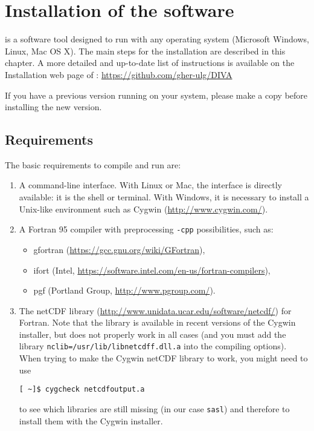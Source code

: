 \chapter{Installation of the software\label{chap:installation}}

\diva is a software tool designed to run with any operating system (Microsoft Windows, Linux, Mac OS X). The main steps for the installation are described in this chapter. A more detailed and up-to-date list of instructions is available on the Installation web page of \diva: \url{https://github.com/gher-ulg/DIVA}

\warning If you have a previous \diva version running on your system, please make a copy before installing the new version.


\minitoc




\section{Requirements}

The basic requirements to compile and run \diva are:
\begin{enumerate}
\item A command-line interface. With Linux or Mac, the interface is directly available: it is the shell or terminal. With Windows, it is necessary to install a Unix-like environment such as Cygwin (\url{http://www.cygwin.com/}).
\item A Fortran 95 compiler with preprocessing \texttt{-cpp} possibilities, such as:
\begin{itemize}
\item gfortran (\url{https://gcc.gnu.org/wiki/GFortran}),
\item ifort (Intel\textsuperscript{\textregistered}, \url{https://software.intel.com/en-us/fortran-compilers}),
\item pgf (Portland Group, \url{http://www.pgroup.com/}).
\end{itemize}    
\item The netCDF library (\url{http://www.unidata.ucar.edu/software/netcdf/}) for Fortran. Note that the library is available in recent versions of the Cygwin installer, but does not properly work in all cases (and you must add the library \texttt{nclib=/usr/lib/libnetcdff.dll.a} into the compiling options). When trying to make the Cygwin netCDF library to work, you might need to use 

\begin{lstlisting}[style=Bash]
[ ~]$ cygcheck netcdfoutput.a
\end{lstlisting}
to see which libraries are still missing (in our case \texttt{sasl}) and therefore to install them with the Cygwin installer.  
\end{enumerate}

